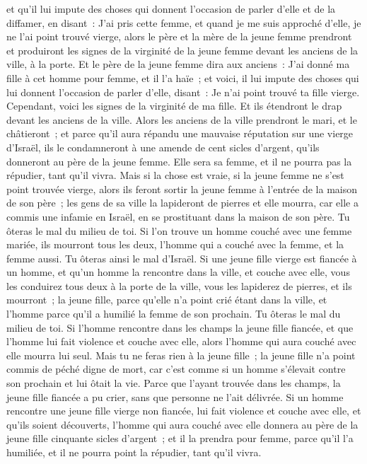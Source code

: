 \begin{multicols}{2}
et qu'il lui impute des choses qui donnent l'occasion de parler d'elle et de la diffamer, en disant~: J'ai pris cette femme, et quand je me suis approché d'elle, je ne l'ai point trouvé vierge,
alors le père et la mère de la jeune femme prendront et produiront les signes de la virginité de la jeune femme devant les anciens de la ville, à la porte.
Et le père de la jeune femme dira aux anciens~: J'ai donné ma fille à cet homme pour femme, et il l'a haïe~;
et voici, il lui impute des choses qui lui donnent l'occasion de parler d'elle, disant~: Je n'ai point trouvé ta fille vierge. Cependant, voici les signes de la virginité de ma fille. Et ils étendront le drap devant les anciens de la ville.
Alors les anciens de la ville prendront le mari, et le châtieront~;
et parce qu'il aura répandu une mauvaise réputation sur une vierge d'Israël, ils le condamneront à une amende de cent sicles d'argent, qu'ils donneront au père de la jeune femme. Elle sera sa femme, et il ne pourra pas la répudier, tant qu'il vivra.
Mais si la chose est vraie, si la jeune femme ne s'est point trouvée vierge,
alors ils feront sortir la jeune femme à l'entrée de la maison de son père~; les gens de sa ville la lapideront de pierres et elle mourra, car elle a commis une infamie en Israël, en se prostituant dans la maison de son père. Tu ôteras le mal du milieu de toi.
Si l'on trouve un homme couché avec une femme mariée, ils mourront tous les deux, l'homme qui a couché avec la femme, et la femme aussi. Tu ôteras ainsi le mal d'Israël.
Si une jeune fille vierge est fiancée à un homme, et qu'un homme la rencontre dans la ville, et couche avec elle,
vous les conduirez tous deux à la porte de la ville, vous les lapiderez de pierres, et ils mourront~; la jeune fille, parce qu'elle n'a point crié étant dans la ville, et l'homme parce qu'il a humilié la femme de son prochain. Tu ôteras le mal du milieu de toi.
Si l'homme rencontre dans les champs la jeune fille fiancée, et que l'homme lui fait violence et couche avec elle, alors l'homme qui aura couché avec elle mourra lui seul.
Mais tu ne feras rien à la jeune fille~; la jeune fille n'a point commis de péché digne de mort, car c'est comme si un homme s'élevait contre son prochain et lui ôtait la vie.
Parce que l'ayant trouvée dans les champs, la jeune fille fiancée a pu crier, sans que personne ne l'ait délivrée.
Si un homme rencontre une jeune fille vierge non fiancée, lui fait violence et couche avec elle, et qu'ils soient découverts,
l'homme qui aura couché avec elle donnera au père de la jeune fille cinquante sicles d'argent~; et il la prendra pour femme, parce qu'il l'a humiliée, et il ne pourra point la répudier, tant qu'il vivra.

\end{multicols}
